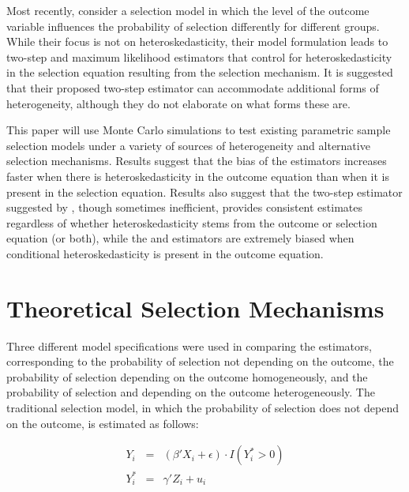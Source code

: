 \documentclass{article}
\begin{document}
Most recently, \citet{reichert2014} consider a selection model in which the level of the outcome variable influences the probability of selection differently for different groups.  While their focus is not on heteroskedasticity, their model formulation leads to two-step and maximum likelihood estimators that control for heteroskedasticity in the selection equation resulting from the selection mechanism.  It is suggested that their proposed two-step estimator can accommodate additional forms of heterogeneity, although they do not elaborate on what forms these are.  

This paper will use Monte Carlo simulations to test existing parametric sample selection models under a variety of sources of heterogeneity and alternative selection mechanisms.  Results suggest that the bias of the estimators increases faster when there is heteroskedasticity in the outcome equation than when it is present in the selection equation.  Results also suggest that the two-step estimator suggested by \citet{reichert2014}, though sometimes inefficient, provides consistent estimates regardless of whether heteroskedasticity stems from the outcome or selection equation (or both), while the \citet{heckman1979} and \citet{schaffner2002} estimators are extremely biased when conditional heteroskedasticity is present in the outcome equation.

\section{Theoretical Selection Mechanisms}

Three different model specifications were used in comparing the estimators, corresponding to the probability of selection not depending on the outcome, the probability of selection depending on the outcome homogeneously, and the probability of selection and depending on the outcome heterogeneously.  The traditional selection model, in which the probability of selection does not depend on the outcome, is estimated as follows:

\begin{eqnarray*}
Y_i&=&(\beta'X_i + \epsilon)\cdot I(Y^*_i>0) \\
Y^*_i&=&\gamma'Z_i + u_i
\end{eqnarray*}
\end{document}
